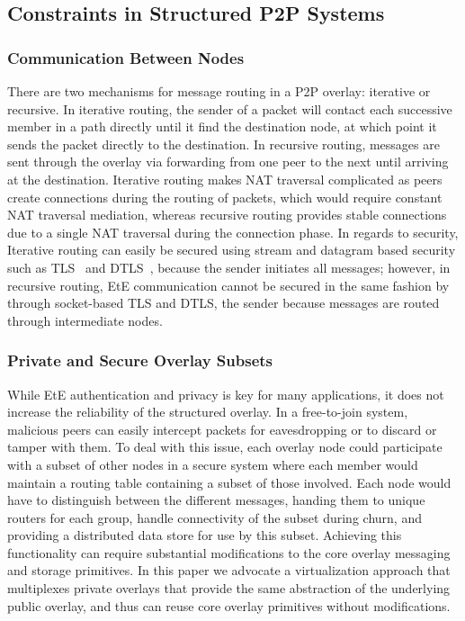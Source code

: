 \documentclass[conference]{IEEEtran}
\begin{document}
\subsection{Constraints in Structured P2P Systems}
\subsubsection{Communication Between Nodes}
There are two mechanisms for message routing in a P2P overlay: iterative or
recursive.  In iterative routing, the sender of a packet will contact each
successive member in a path directly until it find the destination node, at
which point it sends the packet directly to the destination.  In recursive
routing, messages are sent through the overlay via forwarding from one peer to
the next until arriving at the destination.  Iterative routing makes NAT
traversal complicated as peers create connections during the routing of packets,
which would require constant NAT traversal mediation, whereas recursive routing
provides stable connections due to a single NAT traversal during the connection
phase.  In regards to security, Iterative routing can easily be secured using
stream and datagram based security such as TLS~\cite{tls} and DTLS~\cite{dtls},
because the sender initiates all messages; however, in
recursive routing, EtE communication cannot be secured in the same fashion by
through socket-based TLS and DTLS, the sender because messages are routed
through intermediate nodes.

\subsubsection{Private and Secure Overlay Subsets}
While EtE authentication and privacy is key for many applications, it does not increase the reliability of the structured
overlay.  In a free-to-join system, malicious peers can easily intercept packets
for eavesdropping or to discard or tamper with them.  To deal with
this issue, each overlay node could participate with a subset of other nodes in
a secure system where each member would maintain a routing table containing a subset
of those involved.  Each node would have to distinguish between the different
messages, handing them to unique routers for each group, handle connectivity
of the subset during churn, and providing a distributed data store for use by this subset.
Achieving this functionality can require substantial modifications to the core overlay
messaging and storage primitives. In this paper we advocate a virtualization approach
that multiplexes private overlays that provide the same abstraction of the underlying
public overlay, and thus can reuse core overlay primitives without modifications.
\end{document}
